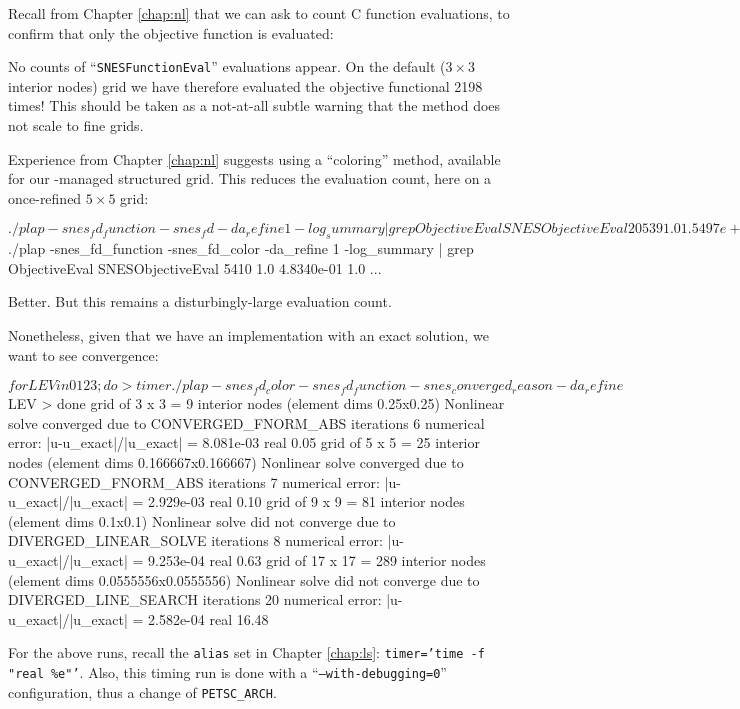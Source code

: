 Recall from Chapter \ref{chap:nl} that we can ask \PETSc to count C function evaluations, to confirm that only the objective function is evaluated:
No counts of ``\texttt{SNESFunctionEval}'' evaluations appear.  On the default ($3$ interior nodes) grid we have therefore evaluated the objective functional 2198 times!  This should be taken as a not-at-all subtle warning that the method does not scale to fine grids.

Experience from Chapter \ref{chap:nl} suggests using a ``coloring'' method, available for our \pDMDA-managed structured grid.  This reduces the evaluation count, here on a once-refined $5 $ grid:
\begin{cline}
$ ./plap -snes_fd_function -snes_fd -da_refine 1 -log_summary | grep ObjectiveEval
SNESObjectiveEval   20539 1.0 1.5497e+00 1.0 ...
$ ./plap -snes_fd_function -snes_fd_color -da_refine 1 -log_summary | grep ObjectiveEval
SNESObjectiveEval    5410 1.0 4.8340e-01 1.0 ...
\end{cline}
\label{page:of:badEvalcount}
Better.  But this remains a disturbingly-large evaluation count.

Nonetheless, given that we have an implementation with an exact solution, we want to see convergence:
\begin{cline}
$ for LEV in 0 1 2 3; do
> timer ./plap -snes_fd_color -snes_fd_function -snes_converged_reason -da_refine $LEV
> done
grid of 3 x 3 = 9 interior nodes (element dims 0.25x0.25)
Nonlinear solve converged due to CONVERGED_FNORM_ABS iterations 6
numerical error:  |u-u_exact|/|u_exact| = 8.081e-03
real 0.05
grid of 5 x 5 = 25 interior nodes (element dims 0.166667x0.166667)
Nonlinear solve converged due to CONVERGED_FNORM_ABS iterations 7
numerical error:  |u-u_exact|/|u_exact| = 2.929e-03
real 0.10
grid of 9 x 9 = 81 interior nodes (element dims 0.1x0.1)
Nonlinear solve did not converge due to DIVERGED_LINEAR_SOLVE iterations 8
numerical error:  |u-u_exact|/|u_exact| = 9.253e-04
real 0.63
grid of 17 x 17 = 289 interior nodes (element dims 0.0555556x0.0555556)
Nonlinear solve did not converge due to DIVERGED_LINE_SEARCH iterations 20
numerical error:  |u-u_exact|/|u_exact| = 2.582e-04
real 16.48
\end{cline}
For the above runs, recall the \texttt{alias} set in Chapter \ref{chap:ls}: \texttt{timer='time -f "real \%e"'}.  Also, this timing run is done with a ``\texttt{--with-debugging=0}'' configuration, thus a change of \texttt{PETSC\_ARCH}.

